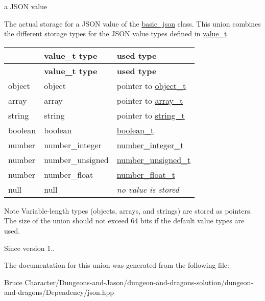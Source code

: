 a J\+S\+ON value 

The actual storage for a J\+S\+ON value of the \hyperlink{classnlohmann_1_1basic__json}{basic\+\_\+json} class. This union combines the different storage types for the J\+S\+ON value types defined in \hyperlink{classnlohmann_1_1basic__json_a231b02148577b69a154b2ce2c87a5522}{value\+\_\+t}.

\tabulinesep=1mm
\begin{longtabu} spread 0pt [c]{*{3}{|X[-1]}|}
\hline
{}&{\bf value\+\_\+t type }&{\bf used type  }\\
\endfirsthead
\hline
\endfoot
\hline
{}&{\bf value\+\_\+t type }&{\bf used type  }\\
\endhead
object &object &pointer to \hyperlink{classnlohmann_1_1basic__json_a0ac9894c9de8dc551cf2e5f1c605537f}{object\+\_\+t} \\
array &array &pointer to \hyperlink{classnlohmann_1_1basic__json_ab00b882d39306d663c23dab110f5cae0}{array\+\_\+t} \\
string &string &pointer to \hyperlink{classnlohmann_1_1basic__json_ab63e618bbb0371042b1bec17f5891f42}{string\+\_\+t} \\
boolean &boolean &\hyperlink{classnlohmann_1_1basic__json_af3bc3e83aa162d7ba4df16a949872723}{boolean\+\_\+t} \\
number &number\+\_\+integer &\hyperlink{classnlohmann_1_1basic__json_ac4b10b2364f26ce47bdb9a413ff04a59}{number\+\_\+integer\+\_\+t} \\
number &number\+\_\+unsigned &\hyperlink{classnlohmann_1_1basic__json_a60a04166c122072ab11eaf9845d9cd1d}{number\+\_\+unsigned\+\_\+t} \\
number &number\+\_\+float &\hyperlink{classnlohmann_1_1basic__json_a74a0013e847fdc574b48f931f0e757e1}{number\+\_\+float\+\_\+t} \\
null &null &{\itshape no value is stored} \\
\end{longtabu}
\begin{DoxyNote}{Note}
Variable-\/length types (objects, arrays, and strings) are stored as pointers. The size of the union should not exceed 64 bits if the default value types are used.
\end{DoxyNote}
\begin{DoxySince}{Since}
version 1.. 
\end{DoxySince}


The documentation for this union was generated from the following file\+:\begin{DoxyCompactItemize}
\item 
Bruce Character/\+Dungeons-\/and-\/\+Jason/dungeon-\/and-\/dragons-\/solution/dungeon-\/and-\/dragons/\+Dependency/json.\+hpp\end{DoxyCompactItemize}
